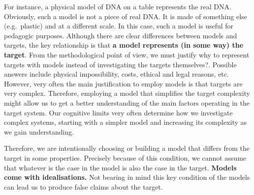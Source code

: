 \documentclass[
]{book}
\begin{document}
For instance, a physical model of DNA on a table represents the real DNA. Obviously, such a model is not a piece of real DNA. It is made of something else (e.g.~plastic) and at a different scale. In this case, such a model is useful for pedagogic purposes. Although there are clear differences between models and targets, the key relationship is that \textbf{a model represents (in some way) the target}. From the methodological point of view, we must justify why to represent targets with models instead of investigating the targets themselves?. Possible answers include physical impossibility, costs, ethical and legal reasons, etc. However, very often the main justification to employ models is that targets are very complex. Therefore, employing a model that simplifies the target complexity might allow us to get a better understanding of the main factors operating in the target system. Our cognitive limits very often determine how we investigate complex systems, starting with a simpler model and increasing its complexity as we gain understanding.

Therefore, we are intentionally choosing or building a model that differs from the target in some properties. Precisely because of this condition, we cannot assume that whatever is the case in the model is also the case in the target. \textbf{Models come with idealisations.} Not bearing in mind this key condition of the models can lead us to produce false claims about the target.
\end{document}
